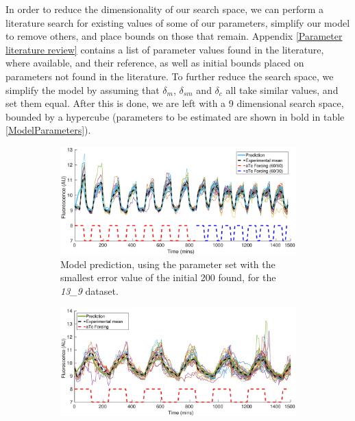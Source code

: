 \documentclass[10pt,journal]{./IEEE_latex_class/IEEEtran}
\begin{document}
In order to reduce the dimensionality of our search space, we can perform a literature search for existing values of some of our parameters, simplify our model to remove others, and place bounds on those that remain. Appendix \ref{Parameter literature review} contains a list of parameter values found in the literature, where available, and their reference, as well as initial bounds placed on parameters not found in the literature. To further reduce the search space, we simplify the model by assuming that $\delta_m$, $\delta_{sm}$ and $\delta_c$ all take similar values, and set them equal. After this is done, we are left with a 9 dimensional search space, bounded by a hypercube (parameters to be estimated are shown in bold in table \ref{ModelParameters}).

 
\begin{figure}
    \begin{subfigure}[c]{0.49\textwidth}
    \centering
    \includegraphics[scale = 0.26,clip = true, trim = 90 0 70 0]{13_9_bestPlot}
        \caption{Model prediction, using the parameter set with the smallest error value of the initial 200 found, for the \textit{13\_9} dataset.}
                \label{InitialResults_13_9_best}
    \end{subfigure}
    \begin{subfigure}[c]{0.49\textwidth}
    \centering
        \includegraphics[scale = 0.26,clip = true, trim = 90 0 70 0]{14_7_bestPlot}

\end{subfigure}
\end{figure}
\end{document}

